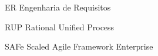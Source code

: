 \begin{siglas}
  \item[ER] Engenharia de Requisitos
  \item[RUP] Rational Unified Process
  \item[SAFe] Scaled Agile Framework Enterprise
\end{siglas}
